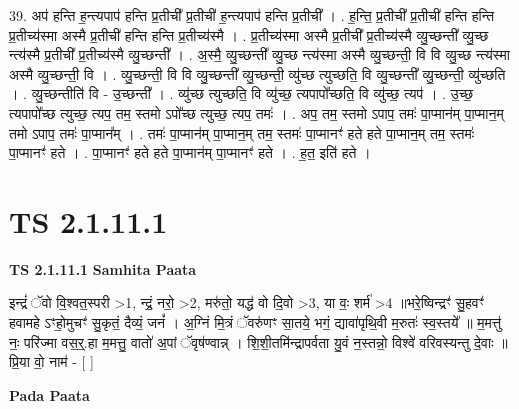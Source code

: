 \documentclass[17pt]{extarticle}
\begin{document}
39. अप॑ हन्ति ह॒न्त्यपाप॑ हन्ति प्र॒तीची᳚ प्र॒तीची॑ ह॒न्त्यपाप॑ हन्ति प्र॒तीची᳚ । . ह॒न्ति॒ प्र॒तीची᳚ प्र॒तीची॑ हन्ति हन्ति प्र॒तीच्य॑स्मा अस्मै प्र॒तीची॑ हन्ति हन्ति प्र॒तीच्य॑स्मै । . प्र॒तीच्य॑स्मा अस्मै प्र॒तीची᳚ प्र॒तीच्य॑स्मै व्यु॒च्छन्ती᳚ व्यु॒च्छ न्त्य॑स्मै प्र॒तीची᳚ प्र॒तीच्य॑स्मै व्यु॒च्छन्ती᳚ । . अ॒स्मै॒ व्यु॒च्छन्ती᳚ व्यु॒च्छ न्त्य॑स्मा अस्मै व्यु॒च्छन्ती॒ वि वि व्यु॒च्छ न्त्य॑स्मा अस्मै व्यु॒च्छन्ती॒ वि । . व्यु॒च्छन्ती॒ वि वि व्यु॒च्छन्ती᳚ व्यु॒च्छन्ती॒ व्यु॑च्छ त्युच्छति॒ वि व्यु॒च्छन्ती᳚ व्यु॒च्छन्ती॒ व्यु॑च्छति । . व्यु॒च्छन्तीति॑ वि - उ॒च्छन्ती᳚ । . व्यु॑च्छ त्युच्छति॒ वि व्यु॑च्छ॒ त्यपापो᳚च्छति॒ वि व्यु॑च्छ॒ त्यप॑ । . उ॒च्छ॒ त्यपापो᳚च्छ त्युच्छ॒ त्यप॒ तम॒ स्तमो ऽपो᳚च्छ त्युच्छ॒ त्यप॒ तमः॑ । . अप॒ तम॒ स्तमो ऽपाप॒ तमः॑ पा॒प्मान॑म् पा॒प्मान॒म् तमो ऽपाप॒ तमः॑ पा॒प्मान᳚म् । . तमः॑ पा॒प्मान॑म् पा॒प्मान॒म् तम॒ स्तमः॑ पा॒प्मानꣳ॑ हते हते पा॒प्मान॒म् तम॒ स्तमः॑ पा॒प्मानꣳ॑ हते । . पा॒प्मानꣳ॑ हते हते पा॒प्मान॑म् पा॒प्मानꣳ॑ हते । . ह॒त॒ इति॑ हते । \newline
\pagebreak
{}
\section*{ TS 2.1.11.1 }

\textbf{TS 2.1.11.1 } \newline
\textbf{Samhita Paata} \newline

इन्द्रं॑ ॅवो वि॒श्वत॒स्परी >1, न्द्रं॒ नरो॒ >2, मरु॑तो॒ यद्ध॑ वो दि॒वो >3, या वः॒ शर्म॑ >4 ॥भरे॒ष्विन्द्रꣳ॑ सु॒हवꣳ॑ हवामहे ऽꣳहो॒मुचꣳ॑ सु॒कृतं॒ दैव्यं॒ जनं᳚ । अ॒ग्निं मि॒त्रं ॅवरु॑णꣳ सा॒तये॒ भगं॒ द्यावा॑पृथि॒वी म॒रुतः॑ स्व॒स्तये᳚ ॥ म॒मत्तु॑ नः॒ परि॑ज्मा वस॒र्॒.हा म॒मत्तु॒ वातो॑ अ॒पां ॅवृष॑ण्वान्न् । शि॒शी॒तमि॑न्द्रापर्वता यु॒वं न॒स्तन्नो॒ विश्वे॑ वरिवस्यन्तु दे॒वाः ॥ प्रि॒या वो॒ नाम॑ - [  ] \newline

\textbf{Pada Paata} \newline
\end{document}
